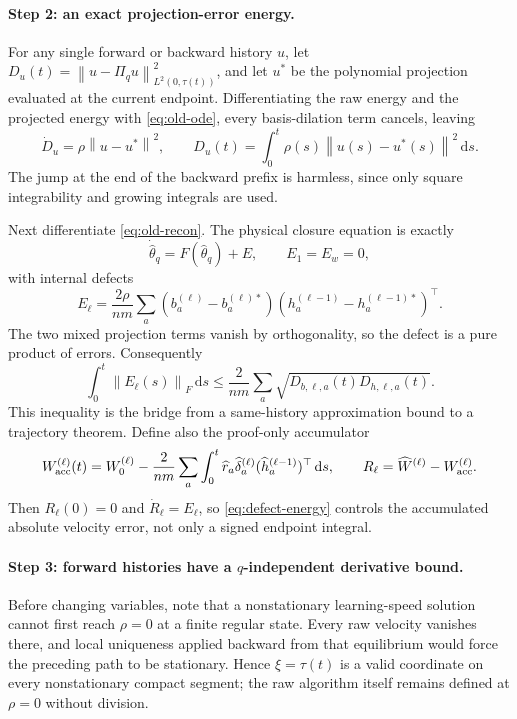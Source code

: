 \documentclass[11pt]{article}
\theoremstyle{definition}
\theoremstyle{remark}
\newcommand{\norm}[1]{\left\lVert #1\right\rVert}
\newcommand{\dd}{\,\mathrm{d}}
\begin{document}
\paragraph{Step 2: an exact projection-error energy.}
For any single forward or backward history $u$, let
$D_u(t)=\norm{u-\Pi_q u}_{L^2(0,\tau(t))}^2$, and let $u^*$ be the polynomial
projection evaluated at the current endpoint.  Differentiating the raw energy
and the projected energy with \eqref{eq:old-ode}, every basis-dilation term
cancels, leaving
\begin{equation}
 \dot D_u=\rho\norm{u-u^*}^2,
 \qquad D_u(t)=\int_0^t\rho(s)\norm{u(s)-u^*(s)}^2\dd s. \label{eq:projection-energy}
\end{equation}
The jump at the end of the backward prefix is harmless, since only square
integrability and growing integrals are used.

Next differentiate \eqref{eq:old-recon}.  The physical closure equation is
exactly
\begin{equation}
 \dot{\widehat\theta}_q=F(\widehat\theta_q)+E,\qquad E_1=E_w=0,
\end{equation}
with internal defects
\begin{equation}
 E_\ell=\frac{2\rho}{nm}\sum_a
 (b^{(\ell)}_a-b^{(\ell)*}_a)(h^{(\ell-1)}_a-h^{(\ell-1)*}_a)^\top. \label{eq:defect}
\end{equation}
The two mixed projection terms vanish by orthogonality, so the defect is a pure
product of errors.  Consequently
\begin{equation}
 \int_0^t\norm{E_\ell(s)}_F\dd s
 \le\frac{2}{nm}\sum_a\sqrt{D_{b,\ell,a}(t)D_{h,\ell,a}(t)}. \label{eq:defect-energy}
\end{equation}
This inequality is the bridge from a same-history approximation bound to a
trajectory theorem.  Define also the proof-only accumulator
\[
 W^{(\ell)}_{\rm acc}(t)=W_0^{(\ell)}
 -\frac{2}{nm}\sum_a\int_0^t
 \widehat r_a\widehat\delta_a^{(\ell)}
 (\widehat h_a^{(\ell-1)})^\top\dd s,\qquad
 R_\ell=\widehat W^{(\ell)}-W^{(\ell)}_{\rm acc}.
\]
Then $R_\ell(0)=0$ and $\dot R_\ell=E_\ell$, so \eqref{eq:defect-energy}
controls the accumulated absolute velocity error, not only a signed endpoint
integral.

\paragraph{Step 3: forward histories have a $q$-independent derivative bound.}
Before changing variables, note that a nonstationary learning-speed solution
cannot first reach $\rho=0$ at a finite regular state.  Every raw velocity
vanishes there, and local uniqueness applied backward from that equilibrium
would force the preceding path to be stationary.  Hence $\xi=\tau(t)$ is a
valid coordinate on every nonstationary compact segment; the raw algorithm
itself remains defined at $\rho=0$ without division.
\end{document}
